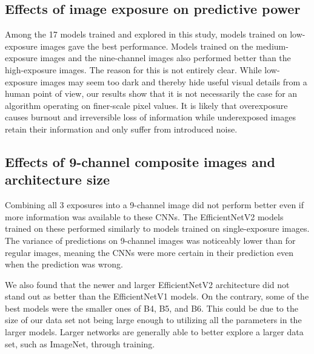 \documentclass[10pt,letterpaper]{article}
\begin{document}
\subsection{Effects of image exposure on predictive power}

Among the 17 models trained and explored in this study, models trained on low-exposure images gave the best performance. Models trained on the medium-exposure images and the nine-channel images also performed better than the high-exposure images. The reason for this is not entirely clear. While low-exposure images may seem too dark and thereby hide useful visual details from a human point of view, our results show that it is not necessarily the case for an algorithm operating on finer-scale pixel values. It is likely that overexposure causes burnout and irreversible loss of information while underexposed images retain their information and only suffer from introduced noise.

\subsection{Effects of 9-channel composite images and architecture size}
Combining all 3 exposures into a 9-channel image did not perform better even if more information was available to these CNNs. The EfficientNetV2 models trained on these performed similarly to models trained on single-exposure images. 
The variance of predictions on 9-channel images was noticeably lower than for regular images, meaning the CNNs were more certain in their prediction even when the  prediction was wrong.

We also found that the newer and larger EfficientNetV2 architecture did not stand out as better than the EfficientNetV1 models. On the contrary, some of the best models were the smaller ones of B4, B5, and B6. This could be due to the size of our data set not being large enough to utilizing all the parameters in the larger models. Larger networks are generally able to better explore a larger data set, such as ImageNet, through training. 
\end{document}

